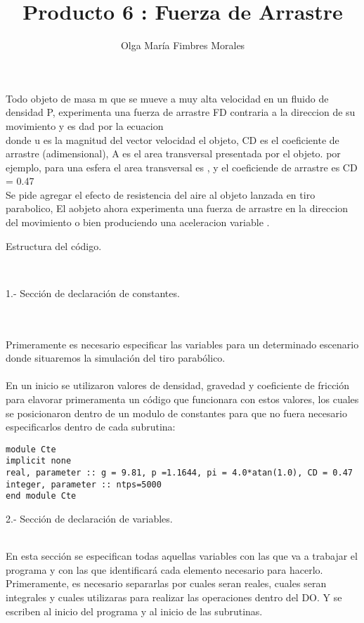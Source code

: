 \documentclass[12pt]{article}
\title{Producto 6 : Fuerza de Arrastre}
\author{Olga María Fimbres Morales}
\date{}
\begin{document}
\maketitle


 
 Todo objeto de masa m que se mueve a muy alta velocidad en un fluido de densidad P, experimenta una fuerza de arrastre FD contraria a la direccion de su movimiento y es dad por la ecuacion \\

donde u es la magnitud del vector velocidad el objeto, CD es el coeficiente de arrastre (adimensional), A es el area transversal presentada por el objeto. por ejemplo, para una esfera el area transversal es  , y el coeficiende de arrastre es CD = 0.47\\

Se pide agregar el efecto de resistencia del aire al objeto lanzada en tiro parabolico, El aobjeto ahora experimenta una fuerza de arrastre en la direccion del movimiento    o bien produciendo una aceleracion variable   .


\newpage
\begin{LARGE}
Estructura del código.
\end{LARGE}\\

\begin{large}
1.- Sección de declaración de constantes.
\end{large}\\
\\
Primeramente es necesario especificar las variables para un determinado escenario donde situaremos la simulación del tiro parabólico.\\ 
\\
En un inicio se utilizaron valores de densidad, gravedad y coeficiente de fricción para elavorar primeramenta un código que funcionara con estos valores, los cuales se posicionaron dentro de un modulo de constantes para que no fuera necesario especificarlos dentro de cada subrutina:
\begin{center}
\begin{verbatim}
module Cte
implicit none 
real, parameter :: g = 9.81, p =1.1644, pi = 4.0*atan(1.0), CD = 0.47
integer, parameter :: ntps=5000
end module Cte
\end{verbatim}
\end{center}

\begin{large}
2.- Sección de declaración de variables.
\end{large}\\
En esta sección se especifican todas aquellas variables con las que va a trabajar el programa y con las que identificará cada elemento necesario para hacerlo. Primeramente, es necesario separarlas por cuales seran reales, cuales seran integrales y cuales utilizaras para realizar las operaciones dentro del DO. Y se escriben al inicio del programa y al inicio de las subrutinas.
\end{document}
